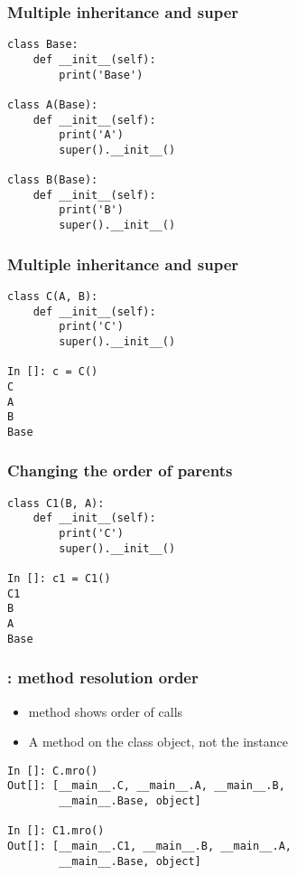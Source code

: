 \documentclass[14pt,compress,aspectratio=169]{beamer}
\begin{document}
\begin{frame}
  \frametitle{Multiple inheritance and super}
  \small
  \vspace*{-0.1in}
  \begin{lstlisting}
class Base:
    def __init__(self):
        print('Base')

class A(Base):
    def __init__(self):
        print('A')
        super().__init__()

class B(Base):
    def __init__(self):
        print('B')
        super().__init__()

  \end{lstlisting}

\end{frame}

\begin{frame}[fragile]
  \frametitle{Multiple inheritance and super}
  \small
  \begin{lstlisting}
class C(A, B):
    def __init__(self):
        print('C')
        super().__init__()

In []: c = C()
C
A
B
Base
\end{lstlisting}

\end{frame}


\begin{frame}[fragile]
  \frametitle{Changing the order of parents}
  \small
  \begin{lstlisting}
class C1(B, A):
    def __init__(self):
        print('C')
        super().__init__()

In []: c1 = C1()
C1
B
A
Base
\end{lstlisting}
\end{frame}

\begin{frame}[fragile]
  \frametitle{:  method resolution order}
  \begin{itemize}
  \item {} method shows order of calls
  \item A method on the class object, not the instance
  \end{itemize}
  \begin{lstlisting}
In []: C.mro()
Out[]: [__main__.C, __main__.A, __main__.B,
        __main__.Base, object]

In []: C1.mro()
Out[]: [__main__.C1, __main__.B, __main__.A,
        __main__.Base, object]
  \end{lstlisting}
\end{frame}
\end{document}
